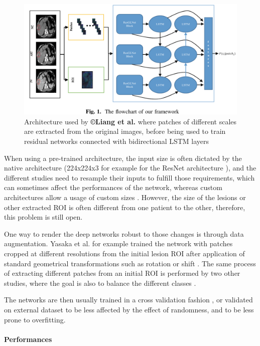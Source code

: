 \documentclass[]{article}
\let\oldparagraph\paragraph
\renewcommand{\paragraph}[1]{\oldparagraph{#1}\mbox{}}
\begin{document}
\begin{figure}[th!]
\centering
\includegraphics[width=0.7\linewidth]{images/image7}
\caption{Architecture used by \textbf{©Liang et al.} where patches of different scales are extracted from the original images, before being used to train residual networks connected with bidirectional LSTM layers \cite{Liang2018}}
\label{Liang2018_Fig1}
\end{figure}



When using a pre-trained architecture, the input size is often dictated
by the native architecture (224x224x3 for example for the ResNet
architecture \cite{Peng2020,WANG2019}), and
the different studies need to resample their inputs to fulfill those
requirements, which can sometimes affect the performances of the
network, whereas custom architectures allow a usage of custom sizes \cite{Liang2018,Yasaka2018,Yasaka2018a}. However, the size of the lesions or other extracted ROI is often different from one patient to the other, therefore, this
problem is still open.

One way to render the deep networks robust to those changes is through
data augmentation. Yasaka et al. for example trained the network
with patches cropped at different resolutions from the initial lesion
ROI after application of standard geometrical transformations
such as rotation or shift \cite{Yasaka2018}. The same
process of extracting different patches from an initial ROI is performed
by two other studies, where the goal is also to balance the different
classes \cite{Yasaka2018a,Peng2020}.

The networks are then usually trained in a cross validation fashion \cite{Yamada2019,Yasaka2018,Yasaka2018a,WANG2019}, or validated on external dataset \cite{Peng2020} to be less affected by the effect of randomness, and to
be less prone to overfitting.

\paragraph{Performances}\label{performances}
\end{document}
